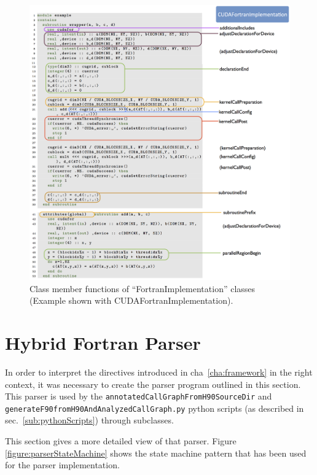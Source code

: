 \begin{figure}[htpb]
	\centering
	\includegraphics[width=12cm]{figures/implementationMap}
	\caption[Switching Fortran Implementations]{Class member functions of ``FortranImplementation'' classes (Example shown with CUDAFortranImplementation).}
	\label{figure:implementationMap}
\end{figure}
\clearpage

\section{Hybrid Fortran Parser} \label{sub:parser}

In order to interpret the directives introduced in cha~\ref{cha:framework} in the right context, it was necessary to create the parser program outlined in this section. This parser is used by the \verb|annotatedCallGraphFromH90SourceDir| and \linebreak \verb|generateF90fromH90AndAnalyzedCallGraph.py| python scripts (as described in sec.~\ref{sub:pythonScripts}) through subclasses. 

This section gives a more detailed view of that parser. Figure \ref{figure:parserStateMachine} shows the state machine pattern that has been used for the parser implementation.

